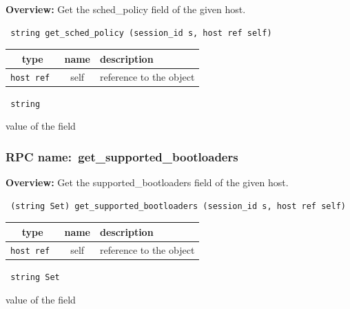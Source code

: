{\bf Overview:} 
Get the sched\_policy field of the given host.

\begin{verbatim} string get_sched_policy (session_id s, host ref self)\end{verbatim}



 
\vspace{0.3cm}
\begin{tabular}{|c|c|p{7cm}|}
 \hline
{\bf type} & {\bf name} & {\bf description} \\ \hline
{\tt host ref } & self & reference to the object \\ \hline 

\end{tabular}

\vspace{0.3cm}

{\tt 
string
}


value of the field
\vspace{0.3cm}
\vspace{0.3cm}
\vspace{0.3cm}
\subsubsection{RPC name:~get\_supported\_bootloaders}

{\bf Overview:} 
Get the supported\_bootloaders field of the given host.

\begin{verbatim} (string Set) get_supported_bootloaders (session_id s, host ref self)\end{verbatim}



 
\vspace{0.3cm}
\begin{tabular}{|c|c|p{7cm}|}
 \hline
{\bf type} & {\bf name} & {\bf description} \\ \hline
{\tt host ref } & self & reference to the object \\ \hline 

\end{tabular}

\vspace{0.3cm}

{\tt 
string Set
}


value of the field
\vspace{0.3cm}
\vspace{0.3cm}
\vspace{0.3cm}
